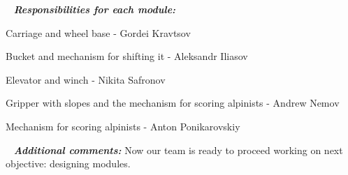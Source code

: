    \newline
  \textit{\textbf{Responsibilities for each module:}}
  \begin{enumerate*}
  	\item Carriage and wheel base - Gordei Kravtsov
  	
  	\item Bucket and mechanism for shifting it - Aleksandr Iliasov
  	
  	\item Elevator and winch - Nikita Safronov
  	
  	\item Gripper with slopes and the mechanism for scoring alpinists - Andrew Nemov
  	
  	\item Mechanism for scoring alpinists - Anton Ponikarovskiy
  \end{enumerate*}
  
   \newline
  \textit{\textbf{Additional comments:}} Now our team is ready to proceed working on next objective: designing modules.

\fillpage
